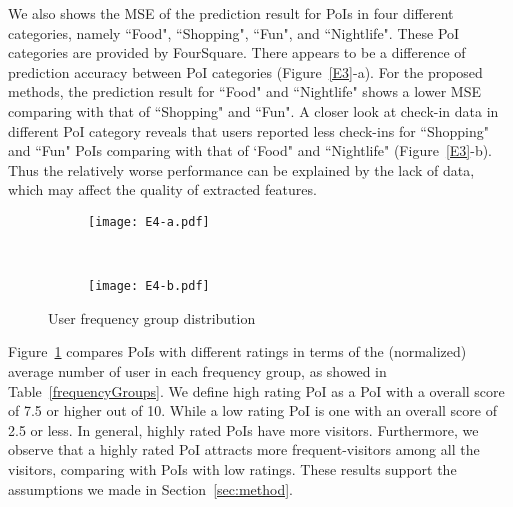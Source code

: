 We also shows the MSE of the prediction result for PoIs in four different categories, namely ``Food", ``Shopping", ``Fun", and ``Nightlife". These PoI categories are provided by FourSquare. There appears to be a difference of prediction accuracy between PoI categories (Figure~\ref{E3}-a). For the proposed methods, the prediction result for ``Food" and ``Nightlife" shows a lower MSE comparing with that of ``Shopping" and ``Fun". A closer look at check-in data in different PoI category reveals that users reported less check-ins for ``Shopping" and ``Fun" PoIs comparing with that of `Food" and ``Nightlife" (Figure~\ref{E3}-b). Thus the relatively worse performance can be explained by the lack of data, which may affect the quality of extracted features.



\begin{figure}[htbp]%
        \centering
        \begin{subfigure}{0.25\textwidth}
               \texttt{[image: E4-a.pdf]}
        \end{subfigure}%
        ~ %
        \begin{subfigure}{0.25\textwidth}
                \texttt{[image: E4-b.pdf]}
        \end{subfigure}
         \caption{User frequency group distribution}\label{E4}
         \vspace{-2mm}
\end{figure}

Figure~\ref{E4} compares PoIs with different ratings in terms of the (normalized) average number of user in each frequency group, as showed in Table~\ref{frequencyGroups}. We define high rating PoI as a PoI with a overall score of 7.5 or higher out of 10. While a low rating PoI is one with an overall score of 2.5 or less. In general, highly rated PoIs have more visitors. Furthermore, we observe that a highly rated PoI attracts more frequent-visitors among all the visitors, comparing with PoIs with low ratings. These results support the assumptions we made in Section~\ref{sec:method}.
